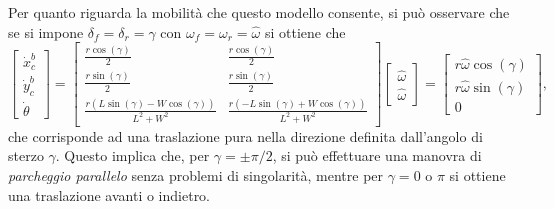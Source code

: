 Per quanto riguarda la mobilità che questo modello consente, si può osservare che se si impone $\delta_f = \delta_r = \gamma$ con $\omega_f = \omega_r = \hat{\omega}$ si ottiene che
\begin{equation}
    \begin{bmatrix}
        \dot{x}_c^b \\
        \dot{y}_c^b \\
        \dot{\theta}
    \end{bmatrix} =
    \begin{bmatrix}
        \frac{r \cos{\left(\gamma \right)}}{2}                               & \frac{r \cos{\left(\gamma \right)}}{2}                                                             \\
        \frac{r \sin{\left(\gamma \right)}}{2}                               & \frac{r \sin{\left(\gamma \right)}}{2}                                                             \\
        \frac{r \left(L \sin(\gamma) - W \cos(\gamma)\right)}{L^{2} + W^{2}} & \frac{r \left(- L \sin{\left(\gamma \right)} + W \cos{\left(\gamma \right)}\right)}{L^{2} + W^{2}}\end{bmatrix}
    \begin{bmatrix}\hat{\omega}\\\hat{\omega}\end{bmatrix} = \left[\begin{matrix}r \hat{\omega} \cos{\left(\gamma \right)}\\r \hat{\omega} \sin{\left(\gamma \right)}\\0\end{matrix}\right],
\end{equation}
che corrisponde ad una traslazione pura nella direzione definita dall'angolo di sterzo $\gamma$. Questo implica che, per $\gamma=\pm \pi/2$, si può effettuare una manovra di \textit{parcheggio parallelo} senza problemi di singolarità, mentre per $\gamma = 0$ o $\pi$ si ottiene una traslazione avanti o indietro.

